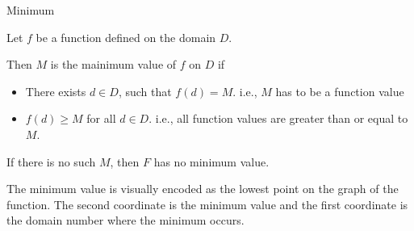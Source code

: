 \documentclass{ximera}
\begin{document}
\begin{definition} Minimum


Let $f$ be a function defined on the domain $D$.

Then $M$ is the mainimum value of $f$ on $D$ if    


\begin{itemize}
\item There exists $d \in D$, such that $f(d) = M$.   i.e., $M$ has to be a function value \\

\item $f(d) \geq M$ for all $d \in D$. i.e., all function values are greater than or equal to $M$. 

\end{itemize}


If there is no such $M$, then $F$ has no minimum value.

\end{definition}



\begin{observation}
The minimum value is visually encoded as the lowest point on the graph of the function.  The second coordinate is the minimum value and the first coordinate is the domain number where the minimum occurs.
\end{observation}
\end{document}
